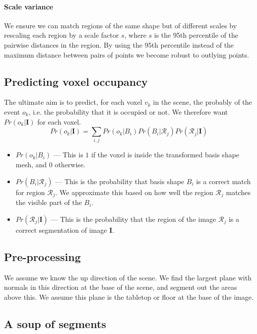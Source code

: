 \documentclass[10pt,a4paper, twocolumn]{article}
\makeatletter
\newcommand*{\ie}{i.e.\@\xspace}
\newcommand{\prob}{Pr}
\newcommand{\rgbdimage}{\mathbf{I}}
\newcommand{\imregion}{\mathcal{R}}
\newcommand{\occ}{o}
\newcommand{\basisshape}{B}
\makeatother
\begin{document}
\paragraph{Scale variance}
We ensure we can match regions of the same shape but of different scales by rescaling each region by a scale factor $s$, where $s$ is the 95th percentile of the pairwise distances in the region. 
By using the 95th percentile instead of the maximum distance between pairs of points we become robust to outlying points.

\subsection{Predicting voxel occupancy}
The ultimate aim is to predict, for each voxel $v_k$ in the scene, the probably of the event $\occ_k$, \ie the probability that it is occupied or not. 
We therefore want $\prob(\occ_k | \rgbdimage)$ for each voxel.
$$
\prob(\occ_k | \rgbdimage) = \sum_{i,j} \prob(\occ_k|\basisshape_i)\prob(\basisshape_i|\imregion_j)\prob(\imregion_j|\rgbdimage)
$$

\begin{itemize}
\item $\prob(\occ_k|\basisshape_i)$ ---
This is $1$ if the voxel is inside the transformed basis shape mesh, and $0$ otherwise.
\item $\prob(\basisshape_i|\imregion_j)$ ---
This is the probability that basis shape $\basisshape_i$ is a correct match for region $\imregion_j$. 
We approximate this based on how well the region $\imregion_j$ matches the visible part of the $\basisshape_i$.
\item $\prob(\imregion_j|\rgbdimage)$ ---
This is the probability that the region of the image $\imregion_j$ is a correct segmentation of image $\rgbdimage$.
\end{itemize}

\subsection{Pre-processing}
We assume we know the up direction of the scene.
We find the largest plane with normals in this direction at the base of the scene, and segment out the areas above this.
We assume this plane is the tabletop or floor at the base of the image.


\subsection{A soup of segments}
\end{document}
